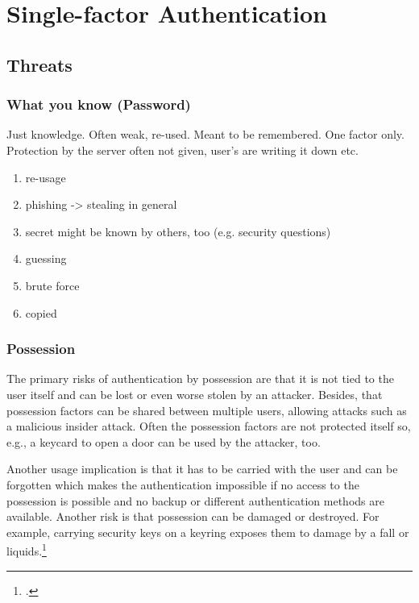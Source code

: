 \chapter{Single-factor Authentication}


\section{Threats}
\label{one-factor-threats}

\subsection{What you know (Password)}

Just knowledge. Often weak, re-used. Meant to be remembered. One factor only.\\
Protection by the server often not given, user's are writing it down etc.

\begin{enumerate}
	\item re-usage
	\item phishing -> stealing in general
	\item secret might be known by others, too (e.g. security questions)
	\item guessing
	\item brute force
	\item copied
\end{enumerate}

\subsection{Possession}

The primary risks of authentication by possession are that it is not tied to the user itself and can be lost or even worse stolen by an attacker. Besides, that possession factors can be shared between multiple users, allowing attacks such as a malicious insider attack. Often the possession factors are not protected itself so, e.g., a keycard to open a door can be used by the attacker, too.

Another usage implication is that it has to be carried with the user and can be forgotten which makes the authentication impossible if no access to the possession is possible and no backup or different authentication methods are available. Another risk is that possession can be damaged or destroyed. For example, carrying security keys on a keyring exposes them to damage by a fall or liquids.\footcites[See][263--264]{shostack2014threat}


